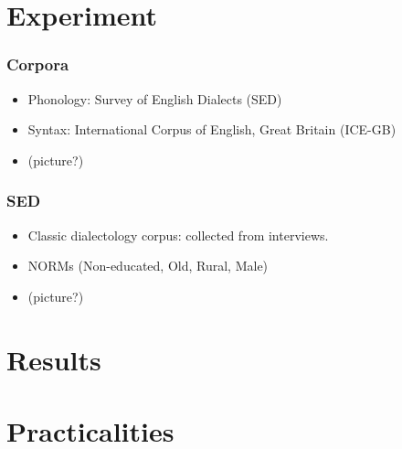 \documentclass{beamer}
\begin{document}
\section{Experiment}
\begin{frame}
  \frametitle{Corpora}
  \begin{itemize}
  \item Phonology: Survey of English Dialects (SED)
  \item Syntax: International Corpus of English, Great Britain
    (ICE-GB)
  \item (picture?)
  \end{itemize}
\end{frame}
\begin{frame}
  \frametitle{SED}
  \begin{itemize}
  \item Classic dialectology corpus: collected from interviews.
  \item NORMs (Non-educated, Old, Rural, Male)
  \item (picture?)
  \end{itemize}
\end{frame}
\section{Results}

\section{Practicalities}
\end{document}
